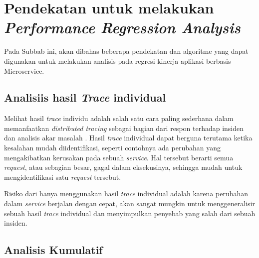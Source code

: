 
\section{Pendekatan untuk melakukan \textit{Performance Regression Analysis}}
Pada Subbab ini, akan dibahas beberapa pendekatan dan algoritme yang dapat digunakan untuk melakukan analisis pada regresi kinerja aplikasi berbasis Microservice.
\label{ch2-algo}


\subsection{Analisiis hasil \textit{Trace} individual}
Melihat hasil \textit{trace} individu adalah salah satu cara paling sederhana dalam memanfaatkan \textit{distributed tracing} sebagai bagian dari respon terhadap insiden dan analisis akar masalah \citep{parker2020distributed}. Hasil \textit{trace} individual dapat berguna terutama ketika kesalahan mudah diidentifikasi, seperti contohnya ada perubahan yang mengakibatkan kerusakan pada sebuah \textit{service}. Hal tersebut berarti semua \textit{request}, atau sebagian besar, gagal dalam eksekusinya, sehingga mudah untuk mengidentifikasi satu \textit{request} tersebut.

Risiko dari hanya menggunakan hasil \textit{trace} individual adalah karena perubahan dalam \textit{service} berjalan dengan cepat, akan sangat mungkin untuk menggeneralisir sebuah hasil \textit{trace} individual dan menyimpulkan penyebab yang salah dari sebuah insiden. 






\subsection{Analisis Kumulatif}
\label{approach-cumulative}

